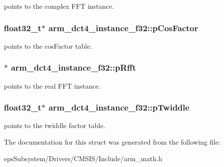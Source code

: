 points to the complex F\-F\-T instance. \hypertarget{structarm__dct4__instance__f32_a6da1187e070801e011ce5e0582efa861}{
\subsubsection[{p\-Cos\-Factor}]{\setlength{\rightskip}{0pt plus 5cm}float32\-\_\-t$\ast$ arm\-\_\-dct4\-\_\-instance\-\_\-f32\-::p\-Cos\-Factor}}\label{structarm__dct4__instance__f32_a6da1187e070801e011ce5e0582efa861}
points to the cos\-Factor table. \hypertarget{structarm__dct4__instance__f32_a978f37fc19add31af243ab5c63ae502f}{
\subsubsection[{p\-Rfft}]{$\ast$ arm\-\_\-dct4\-\_\-instance\-\_\-f32\-::p\-Rfft}}\label{structarm__dct4__instance__f32_a978f37fc19add31af243ab5c63ae502f}
points to the real F\-F\-T instance. \hypertarget{structarm__dct4__instance__f32_ad13544aafad268588c62e3eb35ae662c}{
\subsubsection[{p\-Twiddle}]{\setlength{\rightskip}{0pt plus 5cm}float32\-\_\-t$\ast$ arm\-\_\-dct4\-\_\-instance\-\_\-f32\-::p\-Twiddle}}\label{structarm__dct4__instance__f32_ad13544aafad268588c62e3eb35ae662c}
points to the twiddle factor table. 

The documentation for this struct was generated from the following file\-:\begin{DoxyCompactItemize}
\item 
eps\-Subsystem/\-Drivers/\-C\-M\-S\-I\-S/\-Include/arm\-\_\-math.\-h\end{DoxyCompactItemize}
